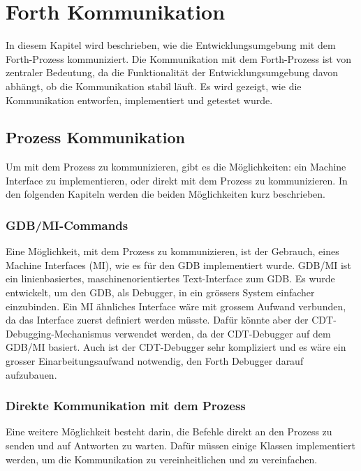 \chapter{Forth Kommunikation}
\label{chap:forthcommunication}

In diesem Kapitel wird beschrieben, wie die Entwicklungsumgebung mit dem Forth-Prozess kommuniziert. Die Kommunikation mit dem Forth-Prozess ist von zentraler Bedeutung, da die Funktionalität der Entwicklungsumgebung davon abhängt, ob die Kommunikation stabil läuft. Es wird gezeigt, wie die Kommunikation entworfen, implementiert und getestet wurde.

\section{Prozess Kommunikation}
Um mit dem Prozess zu kommunizieren, gibt es die Möglichkeiten: ein Machine Interface zu implementieren, oder direkt mit dem Prozess zu kommunizieren. In den folgenden Kapiteln werden die beiden Möglichkeiten kurz beschrieben.

\subsection{GDB/MI-Commands}

Eine Möglichkeit, mit dem Prozess zu kommunizieren, ist der Gebrauch, eines Machine Interfaces (MI), wie es für den GDB implementiert wurde. GDB/MI ist ein linienbasiertes, maschinenorientiertes Text-Interface zum GDB. Es wurde entwickelt, um den GDB, als Debugger, in ein grössers System einfacher einzubinden.\cite{gdb} Ein MI ähnliches Interface wäre mit grossem Aufwand verbunden, da das Interface zuerst definiert werden müsste. Dafür könnte aber der CDT-Debugging-Mechanismus verwendet werden, da der CDT-Debugger auf dem GDB/MI basiert. Auch ist der CDT-Debugger sehr kompliziert\cite{mieclipse} und es wäre ein grosser Einarbeitungsaufwand notwendig, den Forth Debugger darauf aufzubauen.\cite{mieclipse}

\subsection{Direkte Kommunikation mit dem Prozess}

Eine weitere Möglichkeit besteht darin, die Befehle direkt an den Prozess zu senden und auf Antworten zu warten. Dafür müssen einige Klassen implementiert werden, um die Kommunikation zu vereinheitlichen und zu vereinfachen.

